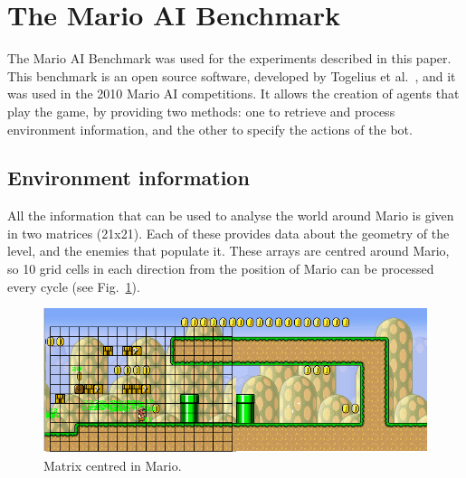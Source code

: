 \documentclass[conference]{IEEEtran}
\begin{document}
\section{The Mario AI Benchmark} \label{sec:marioBench}

The Mario AI Benchmark was used for the experiments
described in this paper. This benchmark is an open source 
software, developed by Togelius et al.~\cite{TKK09}, and it was used 
in the 2010 Mario AI competitions.
It allows the creation of agents that play the game, by 
providing two methods: one to retrieve and process environment information,
and the other to specify the actions of the bot.

\subsection{Environment information} \label{subsec:marioBenchEnviron}

All the information that can be used to analyse the world around Mario is given
in two matrices (21x21). Each of these provides 
data about the geometry of the level, and the enemies that populate it.
These arrays are centred around Mario, so 10 grid cells in each direction from the
position of Mario can be processed every cycle (see Fig.~\ref{fig:matrix}).

\begin{figure} [ht]
	\begin{center}
	\includegraphics[scale=0.45]{images/trapMatrix}
	\caption{Matrix centred in Mario.}
	\label{fig:matrix}
	\end{center}
\end{figure}
\end{document}
